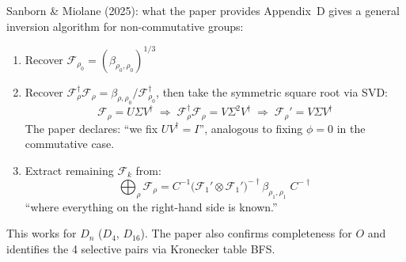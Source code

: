 \documentclass[aspectratio=169]{beamer}
\begin{document}
\begin{frame}{Sanborn \& Miolane (2025): what the paper provides}
  Appendix~D gives a general inversion algorithm for non-commutative groups:

  \begin{enumerate}
    \item Recover $\mathcal{F}_{\rho_0} = (\beta_{\rho_0,\rho_0})^{1/3}$

    \item Recover $\mathcal{F}_\rho^\dagger \mathcal{F}_\rho
          = \beta_{\rho,\rho_0} / \mathcal{F}_{\rho_0}^\dagger$, then take
          the symmetric square root via SVD:
    \[
      \mathcal{F}_\rho = U\Sigma V^\dagger
      \;\Rightarrow\;
      \mathcal{F}_\rho^\dagger \mathcal{F}_\rho = V\Sigma^2 V^\dagger
      \;\Rightarrow\;
      \mathcal{F}_\rho' = V\Sigma V^\dagger
    \]
    The paper declares: ``we fix $UV^\dagger = I$'', analogous to fixing
    $\phi = 0$ in the commutative case.

    \item Extract remaining $\mathcal{F}_k$ from:
    \[
      \bigoplus_\rho \mathcal{F}_\rho
      = C^{-1} \bigl(\mathcal{F}_1' \otimes \mathcal{F}_1'\bigr)^{-\dagger}
        \beta_{\rho_1,\rho_1}\; C^{-\dagger}
    \]
    ``where everything on the right-hand side is known.''
  \end{enumerate}

  \bigskip

  This works for $D_n$ ($D_4$, $D_{16}$). The paper also confirms
  completeness for $O$ and identifies the 4 selective pairs via Kronecker
  table BFS.
\end{frame}
\end{document}
